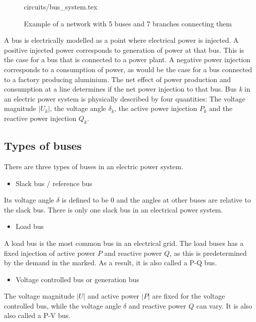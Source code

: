 \documentclass[class=book, crop=false]{standalone}
\begin{document}
\begin{figure}[ht!]
    \center
    {circuits/bus_system.tex}
    \caption[size = 9]
    {Example of a network with 5 buses and 7 branches connecting them}\label{fig:theory:bus_system}
\end{figure}
A bus is electrically modelled as a point where electrical power is injected. A positive injected power corresponds to generation of power at that bus. This is the case for a bus that is connected to a power plant. A negative power injection corresponds to a consumption of power, as would be the case for a bus connected to a factory producing aluminium. The net effect of power production and consumption at a line determines if the net power injection to that bus. Bus \textit{k} in an electric power system is physically described by four quantities: The voltage magnitude $|U_{k}|$, the voltage angle $\delta_{k}$, the active power injection $P_{k}$ and the reactive power injection $Q_{k}$.

\subsection{Types of buses}\label{theory:subsection:bus_types}

There are three types of buses in an electric power system\cite{opf_intro}.

\begin{itemize}
  \item Slack bus / reference bus
\end{itemize}
Its voltage angle $\delta$ is defined to be 0 and the angles at other buses are relative to the slack bus. There is only one slack bus in an electrical power system.

\begin{itemize}
  \item Load bus
\end{itemize}
A load bus is the most common bus in an electrical grid. The load buses has a fixed injection of active power $P$ and reactive power $Q$, as this is predetermined by the demand in the marked. As a result, it is also called a P-Q bus.

\begin{itemize}
  \item Voltage controlled bus or generation bus
\end{itemize}
The voltage magnitude $|U|$ and active power $|P|$ are fixed for the voltage controlled bus, while the voltage angle $\delta$ and reactive power $Q$ can vary. It is also also called a P-V bus. 
\end{document}
